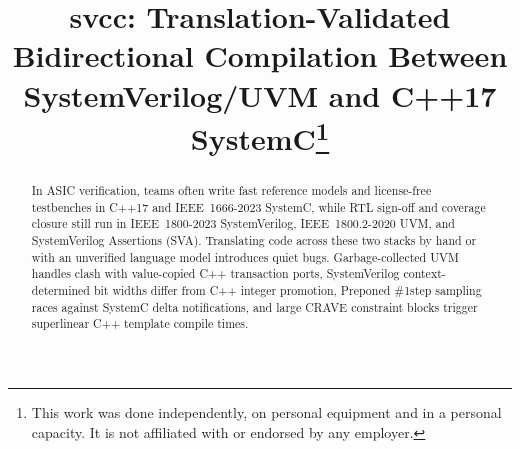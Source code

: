 \documentclass[conference]{IEEEtran}
\newcommand{\code}[1]{{\fontshape{n}\ttfamily #1}}
\begin{document}
\title{svcc: Translation-Validated Bidirectional Compilation Between SystemVerilog/UVM and C++17 SystemC\thanks{This work was done independently, on personal equipment and in a personal capacity. It is not affiliated with or endorsed by any employer.}}

\author{
}

\maketitle
\thispagestyle{plain}

\begin{abstract}
In ASIC verification, teams often write fast reference models and license-free testbenches in C++17 and IEEE~1666-2023 SystemC, while RTL sign-off and coverage closure still run in IEEE~1800-2023 SystemVerilog, IEEE~1800.2-2020 UVM, and SystemVerilog Assertions (SVA). Translating code across these two stacks by hand or with an unverified language model introduces quiet bugs. Garbage-collected UVM handles clash with value-copied C++ transaction ports, SystemVerilog context-determined bit widths differ from C++ integer promotion, Preponed \code{\#1step} sampling races against SystemC delta notifications, and large CRAVE constraint blocks trigger superlinear C++ template compile times.


\end{abstract}
\end{document}
